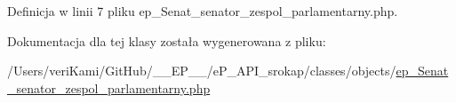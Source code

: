 Definicja w linii 7 pliku ep\-\_\-\-Senat\-\_\-senator\-\_\-zespol\-\_\-parlamentarny.\-php.



Dokumentacja dla tej klasy została wygenerowana z pliku\-:\begin{DoxyCompactItemize}
\item 
/\-Users/veri\-Kami/\-Git\-Hub/\-\_\-\-\_\-\-E\-P\-\_\-\-\_\-/e\-P\-\_\-\-A\-P\-I\-\_\-srokap/classes/objects/\hyperlink{ep___senat__senator__zespol__parlamentarny_8php}{ep\-\_\-\-Senat\-\_\-senator\-\_\-zespol\-\_\-parlamentarny.\-php}\end{DoxyCompactItemize}
